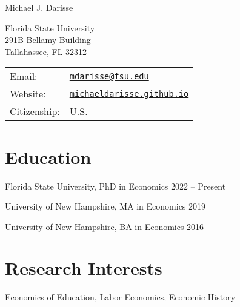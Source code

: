 \documentclass[letterpaper]{article}
\def\name{Michael J. Darisse}
\renewenvironment{itemize}{
  \begin{list}{}{
    \setlength{\leftmargin}{1.5em}
  }
}{
  \end{list}
}
\begin{document}
{\huge \name}


\vspace{0.25in}

\begin{minipage}{0.45\linewidth}
  Florida State University \\
  291B Bellamy Building \\
  Tallahassee, FL 32312 \\
\end{minipage}
\begin{minipage}{0.45\linewidth}
  \begin{tabular}{ll}
    Email: & \href{mailto:mdarisse@fsu.edu}{\tt mdarisse@fsu.edu} \\
    Website: & \href{http://michaeldarisse.github.io/}{\tt michaeldarisse.github.io} \\
    Citizenship: & U.S. \\
  \end{tabular}
\end{minipage}


\section*{Education}

\begin{itemize}
  \item Florida State University, PhD in Economics  \hfill 2022 -- Present 
  \item University of New Hampshire, MA in Economics \hfill 2019 
  \item University of New Hampshire, BA in Economics  \hfill 2016 
\end{itemize}



\section*{Research Interests}

\begin{itemize}
    \item Economics of Education, Labor Economics, Economic History
\end{itemize}
\end{document}
